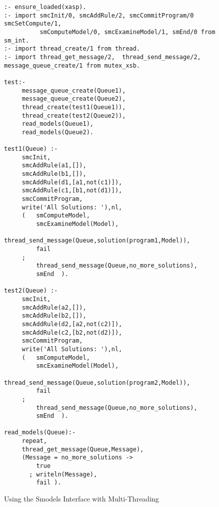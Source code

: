 \begin{figure}[hbtp]
\begin{small}
\begin{verbatim}
:- ensure_loaded(xasp).
:- import smcInit/0, smcAddRule/2, smcCommitProgram/0 smcSetCompute/1, 
          smComputeModel/0, smcExamineModel/1, smEnd/0 from sm_int.
:- import thread_create/1 from thread.
:- import thread_get_message/2,  thread_send_message/2, message_queue_create/1 from mutex_xsb.

test:- 
     message_queue_create(Queue1),
     message_queue_create(Queue2),
     thread_create(test1(Queue1)),
     thread_create(test2(Queue2)),
     read_models(Queue1),
     read_models(Queue2).

test1(Queue) :-
     smcInit,
     smcAddRule(a1,[]),
     smcAddRule(b1,[]),
     smcAddRule(d1,[a1,not(c1)]),
     smcAddRule(c1,[b1,not(d1)]),
     smcCommitProgram,
     write('All Solutions: '),nl,
     (   smComputeModel,
         smcExamineModel(Model),
         thread_send_message(Queue,solution(program1,Model)),
         fail
     ;
         thread_send_message(Queue,no_more_solutions),
         smEnd  ).

test2(Queue) :-
     smcInit,
     smcAddRule(a2,[]),
     smcAddRule(b2,[]),
     smcAddRule(d2,[a2,not(c2)]),
     smcAddRule(c2,[b2,not(d2)]),
     smcCommitProgram,
     write('All Solutions: '),nl,
     (   smComputeModel,
         smcExamineModel(Model),
         thread_send_message(Queue,solution(program2,Model)),
         fail
     ;
         thread_send_message(Queue,no_more_solutions),
         smEnd  ).

read_models(Queue):- 
     repeat,
     thread_get_message(Queue,Message),
     (Message = no_more_solutions ->
         true
       ; writeln(Message),
         fail ).

\end{verbatim}
\end{small}
\caption{Using the Smodels Interface with Multi-Threading} \label{fig:smodelsmt}
\end{figure}



